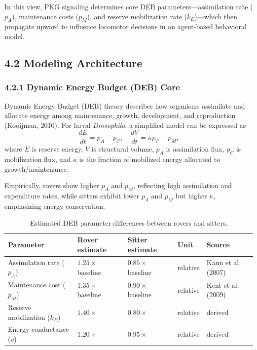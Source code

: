 \documentclass[11pt]{article}
\begin{document}
In this view, PKG signaling determines core DEB parameters---assimilation rate ($p_A$), maintenance costs ($p_M$), and reserve mobilization rate ($k_E$)---which then propagate upward to influence locomotor decisions in an agent-based behavioral model.

\subsection*{4.2 Modeling Architecture}

\subsubsection*{4.2.1 Dynamic Energy Budget (DEB) Core}

Dynamic Energy Budget (DEB) theory describes how organisms assimilate and allocate energy among maintenance, growth, development, and reproduction (Kooijman, 2010). For larval \emph{Drosophila}, a simplified model can be expressed as
\begin{equation}
\frac{dE}{dt} = p_A - p_C, \quad \frac{dV}{dt} = \kappa p_C - p_M,
\end{equation}
where $E$ is reserve energy, $V$ is structural volume, $p_A$ is assimilation flux, $p_C$ is mobilization flux, and $\kappa$ is the fraction of mobilized energy allocated to growth/maintenance.

Empirically, rovers show higher $p_A$ and $p_M$, reflecting high assimilation and expenditure rates, while sitters exhibit lower $p_A$ and $p_M$ but higher $\kappa$, emphasizing energy conservation.

\begin{table}[ht]
  \centering
  \begin{tabular}{lllll}
    \toprule
    Parameter & Rover estimate & Sitter estimate & Unit & Source \\
    \midrule
    Assimilation rate ($p_A$) & $1.25 \times$ baseline & $0.85 \times$ baseline & relative & Kaun et al. (2007) \\
    Maintenance cost ($p_M$) & $1.35 \times$ baseline & $0.90 \times$ baseline & relative & Kent et al. (2009) \\
    Reserve mobilization ($k_E$) & $1.40 \times$ & $0.80 \times$ & relative & derived \\
    Energy conductance ($v$) & $1.20 \times$ & $0.95 \times$ & relative & derived \\
    \bottomrule
  \end{tabular}
  \caption{Estimated DEB parameter differences between rovers and sitters.}
\end{table}
\end{document}
